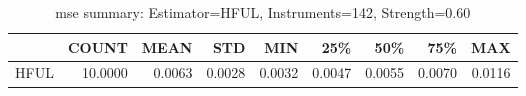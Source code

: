 \begin{table}[ht]
\centering
\caption{mse summary: Estimator=HFUL, Instruments=142, Strength=0.60}
\begin{tabular}{lrrrrrrrr}
\toprule
 & COUNT & MEAN & STD & MIN & 25\% & 50\% & 75\% & MAX \\
\midrule
HFUL & 10.0000 & 0.0063 & 0.0028 & 0.0032 & 0.0047 & 0.0055 & 0.0070 & 0.0116 \\
\bottomrule
\end{tabular}
\end{table}
